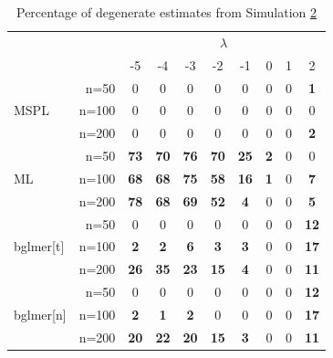 \documentclass[11pt, a4paper]{article}
\newcommand*{\bb}{\boldsymbol}
\theoremstyle{example} \newtheorem{example}{Example}[section]
\theoremstyle{theorem} \newtheorem{theorem}{Theorem}[section]
\theoremstyle{theorem }\newtheorem{proposition}{Proposition}[section]
\theoremstyle{theorem }\newtheorem{corollary}{Corollary}[section]
\def\\bbeta{\bb{\\bbeta}}
\begin{document}
\begin{table}[H]
	\centering
	\caption{Percentage of degenerate estimates from Simulation \hyperref[sec:sim2]{2}} 
	\label{tab:sim2}
	\begin{tabular}{lrcccccccc}
		\toprule 
		&& \multicolumn{8}{c}{$\lambda$} \\ \cmidrule{3-10} 
		&  & -5 & -4 & -3 & -2 & -1 & 0 & 1 & 2 \\ 
		\cmidrule{3-10} 
		& n=50 & 0 & 0 & 0 & 0 & 0 & 0 & 0 & \textbf{1} \\ 
		MSPL & n=100 & 0 & 0 & 0 & 0 & 0 & 0 & 0 & 0 \\ 
		& n=200 & 0 & 0 & 0 & 0 & 0 & 0 & 0 & \textbf{2} \\ 
		\cmidrule{3-10} 
		& n=50 & \textbf{73} & \textbf{70} & \textbf{76} & \textbf{70} & \textbf{25} & \textbf{2} & 0 & 0 \\ 
		ML & n=100 & \textbf{68} & \textbf{68} & \textbf{75} & \textbf{58} & \textbf{16} & \textbf{1} & 0 & \textbf{7} \\ 
		& n=200 & \textbf{78} & \textbf{68} & \textbf{69} & \textbf{52} & \textbf{4} & 0 & 0 & \textbf{5} \\ 
		\cmidrule{3-10} 
		& n=50 & 0 & 0 & 0 & 0 & 0 & 0 & 0 & \textbf{12} \\ 
		bglmer[t] & n=100 & \textbf{2} & \textbf{2} & \textbf{6} & \textbf{3} & \textbf{3} & 0 & 0 & \textbf{17} \\ 
		& n=200 & \textbf{26} & \textbf{35} & \textbf{23} & \textbf{15} & \textbf{4} & 0 & 0 & \textbf{11} \\ 
		\cmidrule{3-10} 
		& n=50 & 0 & 0 & 0 & 0 & 0 & 0 & 0 & \textbf{12} \\ 
		bglmer[n] & n=100 & \textbf{2} & \textbf{1} & \textbf{2} & 0 & 0 & 0 & 0 & \textbf{17} \\ 
		& n=200 & \textbf{20} & \textbf{22} & \textbf{20} & \textbf{15} & \textbf{3} & 0 & 0 & \textbf{11} \\ 
		\bottomrule 
	\end{tabular}
\end{table}



\end{document}

